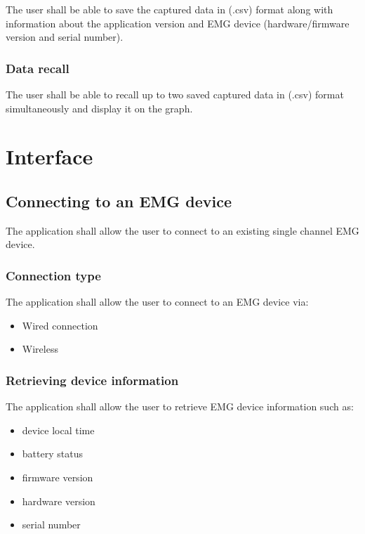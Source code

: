 \documentclass[12pt,a4paper]{article}
\begin{document}
The user shall be able to save the captured data in (.csv) format along with information about the application version and EMG device (hardware/firmware version and serial number).

\subsubsection{Data recall}

The user shall be able to recall up to two saved captured data in (.csv) format simultaneously and display it on the graph.

\section{Interface}

\subsection{Connecting to an EMG device}

The application shall allow the user to connect to an existing single channel EMG device.

\subsubsection{Connection type}

The application shall allow the user to connect to an EMG device via:

\begin{itemize}
\item Wired connection
\item Wireless
\end{itemize}

\subsubsection{Retrieving device information}

The application shall allow the user to retrieve EMG device information such as: 

\begin{itemize}
\item device local time
\item battery status
\item firmware version
\item hardware version
\item serial number
\end{itemize}
\end{document}
